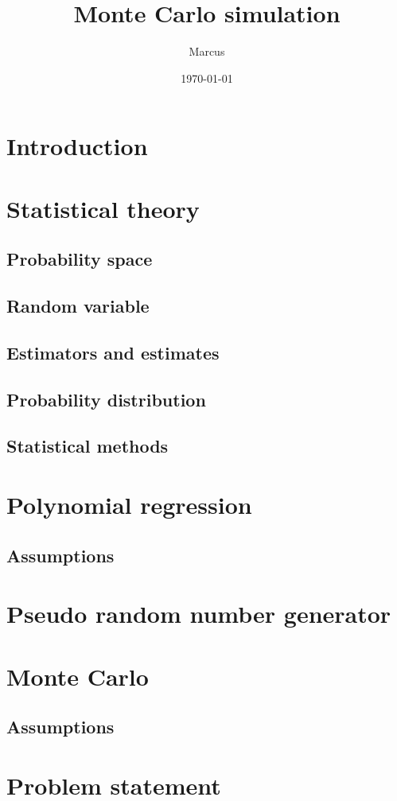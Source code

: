 \documentclass{article}
\title{Monte Carlo simulation}
\author{Marcus}
\date{\today}
\begin{document}
	\maketitle
	\newpage
	\tableofcontents
	\newpage
	\section{Introduction}
	\newpage
	\section{Statistical theory}
	\subsection{Probability space}
	\subsection{Random variable}
	\subsection{Estimators and estimates}
	\subsection{Probability distribution}
	\subsection{Statistical methods}
	\newpage
	\section{Polynomial regression}
	\subsection{Assumptions}
	\newpage
	\section{Pseudo random number generator}
	\newpage
	\section{Monte Carlo}
	\subsection{Assumptions}
	\newpage
	\section{Problem statement}
	\newpage
\end{document}
